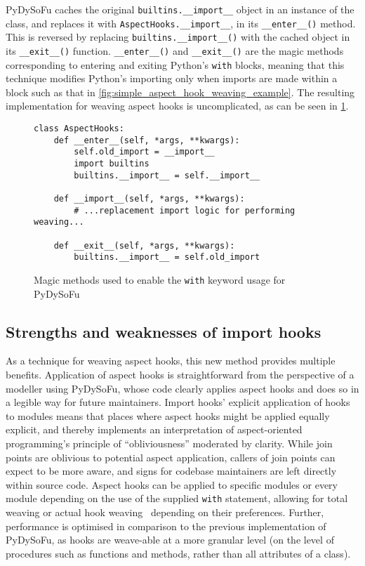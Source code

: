 PyDySoFu caches the original \lstinline{builtins.__import__} object in an
instance of the class, and replaces it with \lstinline{AspectHooks.__import__},
in its \lstinline{__enter__()} method. This is reversed by replacing
\lstinline{builtins.__import__()} with the cached object in its
\lstinline{__exit__()} function. \lstinline{__enter__()} and \lstinline{__exit__()} are the
magic methods corresponding to entering and exiting Python's \lstinline{with} blocks, meaning
that this technique modifies Python's importing only when imports are made
within a block such as that in \cref{fig:simple_aspect_hook_weaving_example}.
The resulting implementation for weaving aspect
hooks is uncomplicated, as can be seen in \cref{fig:aspecthooksmagicmethodswith}.

\begin{figure}[t]
\begin{lstlisting}
class AspectHooks:
    def __enter__(self, *args, **kwargs):
        self.old_import = __import__
        import builtins
        builtins.__import__ = self.__import__

    def __import__(self, *args, **kwargs):
        # ...replacement import logic for performing weaving...

    def __exit__(self, *args, **kwargs):
        builtins.__import__ = self.old_import
\end{lstlisting}
    
    \caption{Magic methods used to enable the \lstinline{with} keyword usage for
    PyDySoFu}
    \label{fig:aspecthooksmagicmethodswith}
\end{figure}

\subsection{Strengths and weaknesses of import hooks}\label{subsec:pdsf3importhooklimitations}

As a technique for weaving aspect hooks, this new method provides multiple
benefits. Application of aspect hooks is straightforward from the perspective of
a modeller using PyDySoFu, whose code clearly applies aspect hooks and does so
in a legible way for future maintainers. Import hooks' explicit application of hooks to modules
means that places where aspect hooks might be applied equally explicit, and thereby implements an
interpretation of aspect-oriented programming's principle of ``obliviousness'' moderated by clarity.
While join points are oblivious to potential aspect application, callers of join points can expect
to be more aware, and signs for codebase maintainers are left directly within source code.
Aspect hooks can be applied to specific modules
or every module depending on the use of the supplied \lstinline{with} statement,
allowing for total weaving or actual hook weaving~\cite{dynamicAOchitchyan}
depending on their preferences. Further, performance is optimised in
comparison to the previous implementation of PyDySoFu, as hooks are weave-able
at a more granular level (on the level of procedures such as functions and
methods, rather than all attributes of a class).

